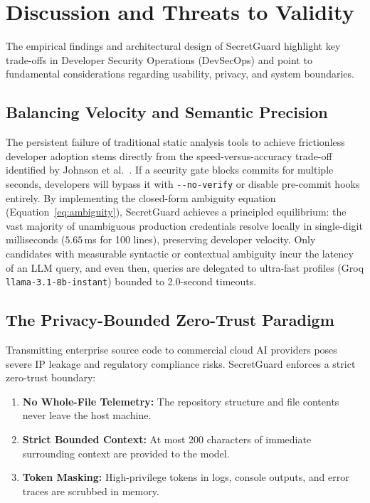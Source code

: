 \section{Discussion and Threats to Validity}
\label{sec:discussion}

The empirical findings and architectural design of SecretGuard highlight key trade-offs in Developer Security Operations (DevSecOps) and point to fundamental considerations regarding usability, privacy, and system boundaries.

\subsection{Balancing Velocity and Semantic Precision}
The persistent failure of traditional static analysis tools to achieve frictionless developer adoption stems directly from the speed-versus-accuracy trade-off identified by Johnson et al.~\cite{johnson2013why}. If a security gate blocks commits for multiple seconds, developers will bypass it with \texttt{-{}-no-verify} or disable pre-commit hooks entirely. By implementing the closed-form ambiguity equation (Equation~\ref{eq:ambiguity}), SecretGuard achieves a principled equilibrium: the vast majority of unambiguous production credentials resolve locally in single-digit milliseconds ($5.65$\,ms for 100 lines), preserving developer velocity. Only candidates with measurable syntactic or contextual ambiguity incur the latency of an LLM query, and even then, queries are delegated to ultra-fast profiles (Groq \texttt{llama-3.1-8b-instant}) bounded to 2.0-second timeouts.

\subsection{The Privacy-Bounded Zero-Trust Paradigm}
Transmitting enterprise source code to commercial cloud AI providers poses severe IP leakage and regulatory compliance risks. SecretGuard enforces a strict zero-trust boundary:
\begin{enumerate}
    \item \textbf{No Whole-File Telemetry:} The repository structure and file contents never leave the host machine.
    \item \textbf{Strict Bounded Context:} At most 200 characters of immediate surrounding context are provided to the model.
    \item \textbf{Token Masking:} High-privilege tokens in logs, console outputs, and error traces are scrubbed in memory.
\end{enumerate}

